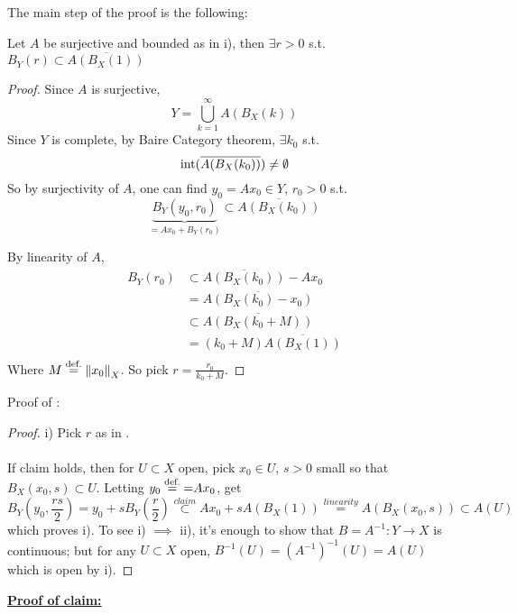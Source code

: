 \documentclass{article}
\begin{document}
The main step of the proof is the following:
\begin{lemma}\nl
\label{open ball is in closure}
Let $A$ be surjective and bounded as in i), then $\exists r>0$ s.t. $B_Y(r)\subset \overline{A(B_X(1))}$
\end{lemma}
\begin{proof}
Since $A$ is surjective, 
$$
Y=\bigcup_{k=1}^\infty A(B_X(k))
$$
Since $Y$ is complete, by  Baire Category theorem, $\exists k_0$ s.t. 
$$ \textrm{int} (\overline{A(B_X(k_0))})\neq\emptyset$$
So by surjectivity of $A$, one can find $y_0=Ax_0\in Y$, $r_0>0$ s.t. 
$$ 
\underbrace{B_Y(y_0,r_0)}_{=Ax_0+B_Y(r_0)}\subset \overline{A(B_X(k_0))}
$$

By linearity of $A$,
\begin{equation}\nonumber
    \begin{split}
        B_Y(r_0)&\subset\overline{A(B_X(k_0))}-Ax_0 \\ &=\overline{A(B_X(k_0)-x_0)}\\
        &\subset \overline{A(B_X(k_0+M))}   \\
        &=(k_0+M)\overline{A(B_X(1))}\\
    \end{split}
\end{equation}
Where $M\stackrel{\text{def.}}{=} \left\|{x_0}\right\|_X$. So pick $r=\frac{r_0}{k_0+M}$.
\end{proof}


Proof of :  

\begin{proof}
i) Pick $r$ as in .\\
\\
If claim holds, then for $U\subset X$ open, pick $x_0\in U$, $s>0$ small so that $B_X(x_0,s)\subset U$. Letting $y_0\stackrel{\text{def.}}{=}{=}Ax_0$, get 
$$
B_Y(y_0,\frac{rs}{2})=y_0+sB_Y(\frac{r}{2})\stackrel{claim}{\subset}Ax_0+sA(B_X(1))\stackrel{linearity}{=}A(B_X(x_0,s))\subset A(U)
$$
which proves i). To see i) $\implies$ ii), it's enough to show that $B=A^{-1}:Y\to X$ is continuous; but for any $U\subset X$ open, $B^{-1}(U)=(A^{-1})^{-1}(U)=A(U)$
which is open by i).
\end{proof}

\underline{\textbf{Proof of claim:}}
\end{document}
